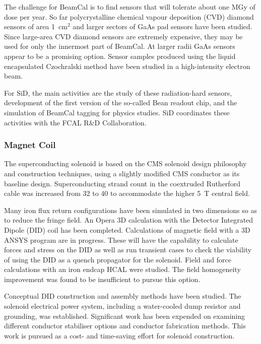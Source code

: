 The challenge for BeamCal is to find sensors that will tolerate about one MGy
of dose per year. So far polycrystalline chemical vapour deposition (CVD) diamond
sensors of area 1~cm$^2$ and larger sectors of GaAs pad sensors have been studied. Since
large-area CVD diamond sensors are extremely expensive, they may be used for only
the innermost part of BeamCal. At larger radii GaAs sensors appear to be a
promising option. Sensor samples produced using the liquid encapsulated
Czochralski method have been studied in a high-intensity electron beam. 

For SiD,
the main activities are the study of these radiation-hard sensors, development
of the first version of the so-called Bean readout chip, and the simulation of BeamCal
tagging for physics studies. SiD coordinates these activities with the FCAL R\&D Collaboration. 

\subsubsection{Magnet Coil}

The \sid superconducting solenoid is based on the CMS solenoid
design philosophy and construction techniques, using a slightly modified CMS
conductor as its baseline design. Superconducting strand count in the coextruded
Rutherford cable was increased from 32 to 40 to accommodate the higher 5~T
central field. 

Many iron flux return configurations have been simulated in two
dimensions so as to reduce the fringe field. An Opera 3D calculation with the Detector
Integrated Dipole (DID) coil has been completed.
Calculations of magnetic field with a 3D ANSYS program
are in progress. These will have the capability to calculate forces and stress
on the DID as well as run transient cases to check the viability of using the
DID as a quench propagator for the solenoid. Field and force calculations with
an iron endcap HCAL were studied. The field homogeneity improvement was found
to be insufficient to pursue this option. 

Conceptual DID construction and
assembly methods have been studied. The solenoid electrical power system,
including a water-cooled dump resistor and grounding, was established.
Significant work has been expended on examining different conductor stabiliser
options and conductor fabrication methods. This work is pursued as a cost- and
time-saving effort for solenoid construction.

